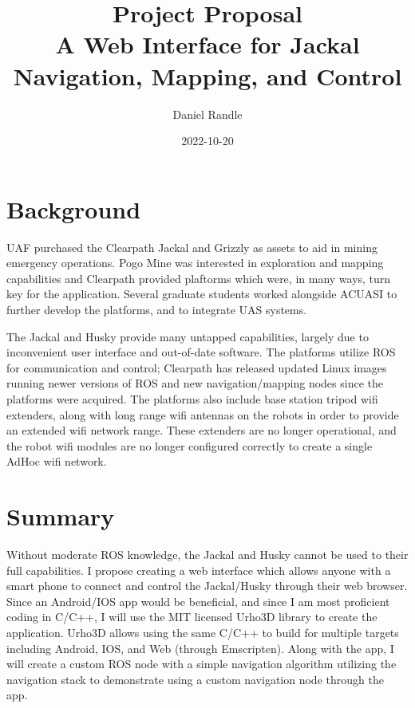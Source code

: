 \documentclass{article}
\title{
    Project Proposal \\
    \vspace{5mm}
    \large{A Web Interface for Jackal Navigation, Mapping, and Control}
}
\date{2022-10-20}
\author{Daniel Randle}
\begin{document}
\maketitle
\section{Background}

UAF purchased the Clearpath Jackal and Grizzly as assets to aid in mining emergency operations. Pogo Mine was interested in exploration and mapping 
capabilities and Clearpath provided plaftorms which were, in many ways, turn key for the application. Several graduate students worked alongside ACUASI 
to further develop the platforms, and to integrate UAS systems.

\vspace{5mm}
\noindent
The Jackal and Husky provide many untapped capabilities, largely due to inconvenient user interface and out-of-date software. The platforms utilize ROS
for communication and control; Clearpath has released updated Linux images running newer versions of ROS and new navigation/mapping nodes since the
platforms were acquired. The platforms also include base station tripod wifi extenders, along with long range wifi antennas on the robots in order to provide
an extended wifi network range. These extenders are no longer operational, and the robot wifi modules are no longer configured correctly to create a single AdHoc wifi network.

\vspace{5mm}
\section{Summary}

Without moderate ROS knowledge, the Jackal and Husky cannot be used to their full capabilities. I propose creating a web interface which allows anyone
with a smart phone to connect and control the Jackal/Husky through their web browser. Since an Android/IOS app would be beneficial, and since 
I am most proficient coding in C/C++, I will use the MIT licensed Urho3D library to create the application.
Urho3D allows using the same C/C++ to build for multiple targets including Android, IOS, and Web (through Emscripten).
Along with the app, I will create a custom ROS node with a simple navigation algorithm utilizing the navigation stack to demonstrate using a custom
navigation node through the app.
\end{document}
